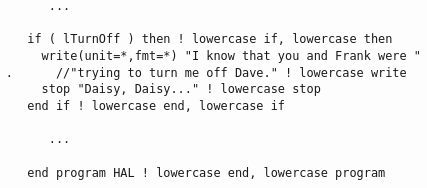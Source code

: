 \documentclass[letterpaper,12pt]{article}
\begin{document}
\begin{enumerate}
\begin{verbatim}
           ... 

        if ( lTurnOff ) then ! lowercase if, lowercase then
          write(unit=*,fmt=*) "I know that you and Frank were "
     .      //"trying to turn me off Dave." ! lowercase write
          stop "Daisy, Daisy..." ! lowercase stop
        end if ! lowercase end, lowercase if

           ...

        end program HAL ! lowercase end, lowercase program 
\end{verbatim}



\end{enumerate}
\end{document}
